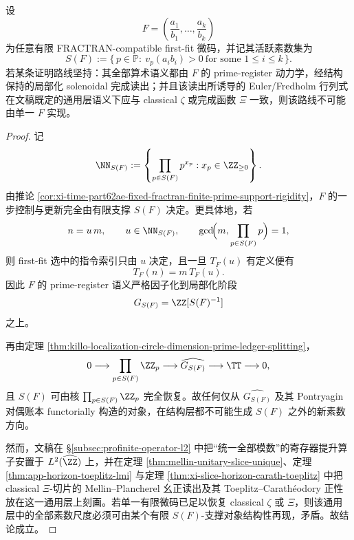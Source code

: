 \begin{theorem}\label{thm:xi-time-part62ae-single-firstfit-classical-euler-obstruction}
设
\[
F=\left(\frac{a_1}{b_1},\dots,\frac{a_k}{b_k}\right)
\]
为任意有限 FRACTRAN-compatible first-fit 微码，并记其活跃素数集为
\[
S(F):=\{\,p\in\mathbb P:\ v_p(a_i b_i)>0\ \text{for some }1\le i\le k\,\}.
\]
若某条证明路线坚持：其全部算术语义都由 \(F\) 的 prime-register 动力学，经结构保持的局部化 solenoidal 完成读出；并且该读出所诱导的 Euler/Fredholm 行列式在文稿既定的通用层语义下应与 classical \(\zeta\) 或完成函数 \(\Xi\) 一致，则该路线不可能由单一 \(F\) 实现。
\end{theorem}
\begin{proof}
记
\[
\NN_{S(F)}
:=
\left\{
\prod_{p\in S(F)}p^{x_p}:x_p\in\ZZ_{\ge 0}
\right\}.
\]
由推论 \ref{cor:xi-time-part62ae-fixed-fractran-finite-prime-support-rigidity}，\(F\) 的一步控制与更新完全由有限支撑 \(S(F)\) 决定。更具体地，若
\[
n=u\,m,
\qquad
u\in \NN_{S(F)},
\qquad
\gcd\!\Bigl(m,\prod_{p\in S(F)}p\Bigr)=1,
\]
则 first-fit 选中的指令索引只由 \(u\) 决定，且一旦 \(T_F(u)\) 有定义便有
\[
T_F(n)=m\,T_F(u).
\]
因此 \(F\) 的 prime-register 语义严格因子化到局部化阶段
\[
G_{S(F)}=\ZZ[S(F)^{-1}]
\]
之上。

再由定理 \ref{thm:killo-localization-circle-dimension-prime-ledger-splitting}，
\[
0\longrightarrow \prod_{p\in S(F)}\ZZ_p
\longrightarrow \widehat{G_{S(F)}}
\longrightarrow \TT
\longrightarrow 0,
\]
且 \(S(F)\) 可由核 \(\prod_{p\in S(F)}\ZZ_p\) 完全恢复。故任何仅从 \(\widehat{G_{S(F)}}\) 及其 Pontryagin 对偶账本 functorially 构造的对象，在结构层都不可能生成 \(S(F)\) 之外的新素数方向。

然而，文稿在 \S\ref{subsec:profinite-operator-l2} 中把“统一全部模数”的寄存器提升算子安置于 \(L^2(\widehat{\ZZ})\) 上，并在定理 \ref{thm:mellin-unitary-slice-unique}、定理 \ref{thm:app-horizon-toeplitz-lmi} 与定理 \ref{thm:xi-slice-horizon-carath-toeplitz} 中把 classical \(\Xi\)-切片的 Mellin--Plancherel 幺正读出及其 Toeplitz--Carath\'eodory 正性放在这一通用层上刻画。若单一有限微码已足以恢复 classical \(\zeta\) 或 \(\Xi\)，则该通用层中的全部素数尺度必须可由某个有限 \(S(F)\)-支撑对象结构性再现，矛盾。故结论成立。
\end{proof}


